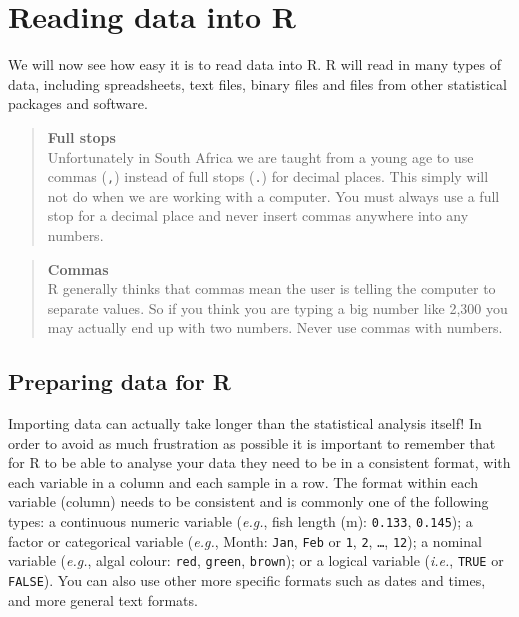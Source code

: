 \documentclass[
]{book}
\begin{document}
\hypertarget{reading-data-into-r}{%
\section{Reading data into R}\label{reading-data-into-r}}

We will now see how easy it is to read data into R. R will read in many types of data, including spreadsheets, text files, binary files and files from other statistical packages and software.

\begin{quote}
\textbf{Full stops}\\
Unfortunately in South Africa we are taught from a young age to use commas (\texttt{,}) instead of full stops (\texttt{.}) for decimal places. This simply will not do when we are working with a computer. You must always use a full stop for a decimal place and never insert commas anywhere into any numbers.
\end{quote}

\begin{quote}
\textbf{Commas}\\
R generally thinks that commas mean the user is telling the computer to separate values. So if you think you are typing a big number like 2,300 you may actually end up with two numbers. Never use commas with numbers.
\end{quote}

\hypertarget{preparing-data-for-r}{%
\subsection{Preparing data for R}\label{preparing-data-for-r}}

Importing data can actually take longer than the statistical analysis itself! In order to avoid as much frustration as possible it is important to remember that for R to be able to analyse your data they need to be in a consistent format, with each variable in a column and each sample in a row. The format within each variable (column) needs to be consistent and is commonly one of the following types: a continuous numeric variable (\emph{e.g.}, fish length (m): \texttt{0.133}, \texttt{0.145}); a factor or categorical variable (\emph{e.g.}, Month: \texttt{Jan}, \texttt{Feb} or \texttt{1}, \texttt{2}, \texttt{\ldots{}}, \texttt{12}); a nominal variable (\emph{e.g.}, algal colour: \texttt{red}, \texttt{green}, \texttt{brown}); or a logical variable (\emph{i.e.}, \texttt{TRUE} or \texttt{FALSE}). You can also use other more specific formats such as dates and times, and more general text formats.
\end{document}
